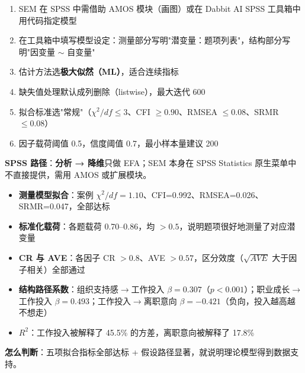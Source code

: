 \begin{algosposs}
\begin{enumerate}
    \item SEM 在 SPSS 中需借助 AMOS 模块（画图）或在 Dabbit AI SPSS 工具箱中用代码指定模型
    \item 在工具箱中填写模型设定：测量部分写明"潜变量：题项列表"，结构部分写明"因变量 $\sim$ 自变量"
    \item 估计方法选\textbf{极大似然（ML）}，适合连续指标
    \item 缺失值处理默认成列删除（listwise），最大迭代 600
    \item 拟合标准选"常规"（$\chi^2/df \leq 3$、CFI $\geq 0.90$、RMSEA $\leq 0.08$、SRMR $\leq 0.08$）
    \item 因子载荷阈值 0.5，信度阈值 0.7，最小样本量建议 200
\end{enumerate}

\textbf{SPSS 路径}：\textbf{分析 → 降维}只做 EFA；SEM 本身在 SPSS Statistics 原生菜单中不直接提供，需用 AMOS 或扩展模块。
\end{algosposs}

\begin{algoresult}
\begin{itemize}
    \item \textbf{测量模型拟合}：案例 $\chi^2/df=1.10$、CFI=0.992、RMSEA=0.026、SRMR=0.047，全部达标
    \item \textbf{标准化载荷}：各题载荷 0.70--0.86，均 $>0.5$，说明题项很好地测量了对应潜变量
    \item \textbf{CR 与 AVE}：各因子 CR $>0.8$、AVE $>0.57$，区分效度（$\sqrt{AVE}$ 大于因子相关）全部通过
    \item \textbf{结构路径系数}：组织支持感$\to$工作投入 $\beta=0.307$（$p<0.001$）；职业成长$\to$工作投入 $\beta=0.493$；工作投入$\to$离职意向 $\beta=-0.421$（负向，投入越高越不想走）
    \item \textbf{$R^2$}：工作投入被解释了 45.5\% 的方差，离职意向被解释了 17.8\%
\end{itemize}

\textbf{怎么判断}：五项拟合指标全部达标 + 假设路径显著，就说明理论模型得到数据支持。
\end{algoresult}

